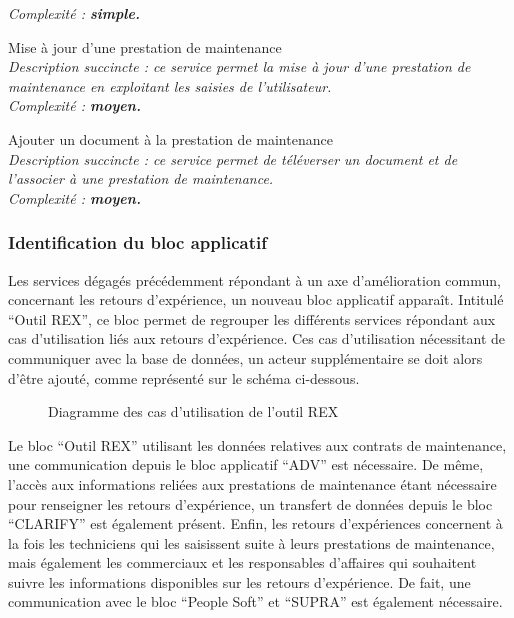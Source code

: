 \begin{description}
        \it{Complexité :} \bf{simple}.
    \item[\textbullet] Mise à jour d’une prestation de maintenance \\
        \it{Description succincte :} ce service permet la mise à jour d’une prestation de maintenance en exploitant les saisies de l’utilisateur. \\
        \it{Complexité :} \bf{moyen}.
    \item[\textbullet] Ajouter un document à la prestation de maintenance \\
        \it{Description succincte :} ce service permet de téléverser un document et de l’associer à une prestation de maintenance. \\
        \it{Complexité :} \bf{moyen}.
\end{description}

\subsubsection{Identification du bloc applicatif}

Les services dégagés précédemment répondant à un axe d’amélioration commun, concernant les retours d’expérience, un nouveau bloc applicatif apparaît. Intitulé “Outil REX”, ce bloc permet de regrouper les différents services répondant aux cas d’utilisation liés aux retours d’expérience. Ces cas d’utilisation nécessitant de communiquer avec la base de données, un acteur supplémentaire se doit alors d’être ajouté, comme représenté sur le schéma ci-dessous.

\begin{figure}[H]
    \label{fig-uc-rex}
    \noindent{}
    \caption{Diagramme des cas d'utilisation de l'outil REX}
\end{figure}

Le bloc “Outil REX” utilisant les données relatives aux contrats de maintenance, une communication depuis le bloc applicatif “ADV” est nécessaire. De même, l’accès aux informations reliées aux prestations de maintenance étant nécessaire pour renseigner les retours d’expérience, un transfert de données depuis le bloc “CLARIFY” est également présent. Enfin, les retours d’expériences concernent à la fois les techniciens qui les saisissent suite à leurs prestations de maintenance, mais également les commerciaux et les responsables d’affaires qui souhaitent suivre les informations disponibles sur les retours d’expérience. De fait, une communication avec le bloc “People Soft” et “SUPRA” est également nécessaire.

